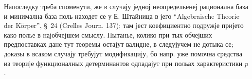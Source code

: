 ﻿\documentclass[11pt]{article}
\begin{document}
Напоследку треба споменути, же в случају једној неопредельенеј рационална база и минимална база поль находет се у Е. Штайница в јего ``Algebraische Theorie der Körper'', \S\ 24 (Crelles Journ. 137); там јест коефициентно подружје пријето како полье в најобчејшем смыслу. Пытанье, колико при тых обчејших предпоставках дане тут теоремы остајут валидне, в следујучем не дотыка се; доказы в всаком случају требујут модификацију, бо напр. уже помочна средства из теорије функционалных детерминантов одпадајут при польах характеристики $p$.
\end{document}
